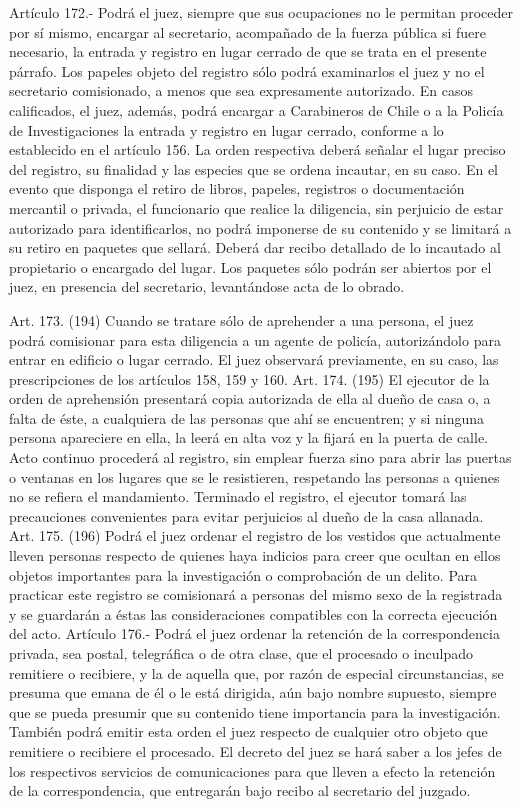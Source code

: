     Artículo 172.- Podrá el juez, siempre que sus ocupaciones no le permitan proceder por sí mismo, encargar al secretario, acompañado de la fuerza pública si fuere necesario, la entrada y registro en lugar cerrado de que se trata en el presente párrafo.
    Los papeles objeto del registro sólo podrá examinarlos el juez y no el secretario comisionado, a menos que sea expresamente autorizado.
    En casos calificados, el juez, además, podrá encargar a Carabineros de Chile o a la Policía de Investigaciones la entrada y registro en lugar cerrado, conforme a lo establecido en el artículo 156. La orden respectiva deberá señalar el lugar preciso del registro, su finalidad y las especies que se ordena incautar, en su caso. En el evento que disponga el retiro de libros, papeles, registros o documentación mercantil o privada, el funcionario que realice la diligencia, sin perjuicio de estar autorizado para identificarlos, no podrá imponerse de su contenido y se limitará a su retiro en paquetes que sellará. Deberá dar recibo detallado de lo incautado al propietario o encargado del lugar. Los paquetes sólo podrán ser abiertos por el juez, en presencia del secretario, levantándose acta de lo obrado.

    Art. 173. (194) Cuando se tratare sólo de aprehender a una persona, el juez podrá comisionar para esta diligencia a un agente de policía, autorizándolo para entrar en edificio o lugar cerrado. El juez observará previamente, en su caso, las prescripciones de los artículos 158, 159 y 160.
    Art. 174. (195) El ejecutor de la orden de aprehensión presentará copia autorizada de ella al dueño de casa o, a falta de éste, a cualquiera de las personas que ahí se encuentren; y si ninguna persona apareciere en ella, la leerá en alta voz y la fijará en la puerta de calle.
    Acto continuo procederá al registro, sin emplear fuerza sino para abrir las puertas o ventanas en los lugares que se le resistieren, respetando las personas a quienes no se refiera el mandamiento.
    Terminado el registro, el ejecutor tomará las precauciones convenientes para evitar perjuicios al dueño de la casa allanada.
    Art. 175. (196) Podrá el juez ordenar el registro de los vestidos que actualmente lleven personas respecto de quienes haya indicios para creer que ocultan en ellos objetos importantes para la investigación o comprobación de un delito.
    Para practicar este registro se comisionará a personas del mismo sexo de la registrada y se guardarán a éstas las consideraciones compatibles con la correcta ejecución del acto.
    Artículo 176.- Podrá el juez ordenar la retención de la correspondencia privada, sea postal, telegráfica o de otra clase, que el procesado o inculpado remitiere o recibiere, y la de aquella que, por razón de especial circunstancias, se presuma que emana de él o le está dirigida, aún bajo nombre supuesto, siempre que se pueda presumir que su contenido tiene importancia para la investigación.  También podrá emitir  esta orden el juez respecto de cualquier otro objeto que remitiere o recibiere el procesado.
    El decreto del juez se hará saber a los jefes de los respectivos servicios de comunicaciones para que lleven a efecto la retención de la correspondencia, que entregarán bajo recibo al secretario del juzgado.

